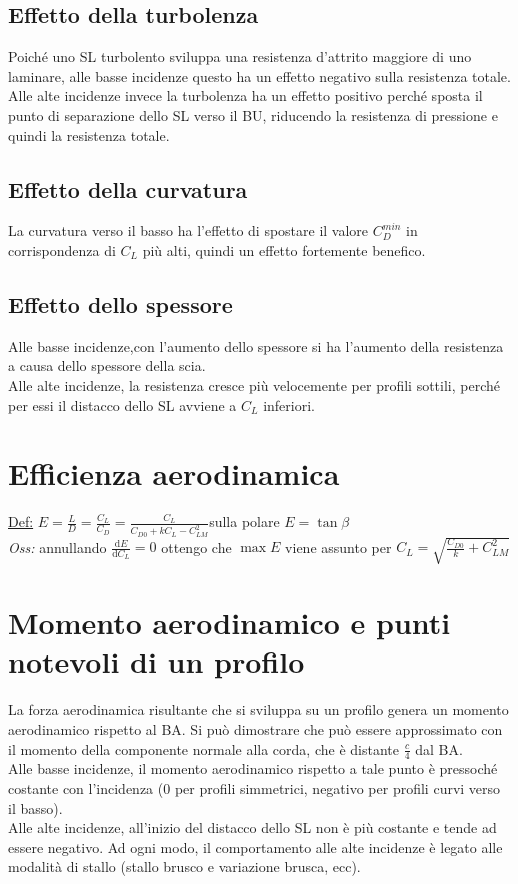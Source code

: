 \documentclass[11pt,a4paper]{report}
\newcommand{\de}{\mathrm d}
\begin{document}
		\subsection{Effetto della turbolenza}
		Poiché uno SL turbolento sviluppa una resistenza d'attrito maggiore di uno laminare, alle basse incidenze questo ha un effetto negativo sulla resistenza totale. Alle alte incidenze invece la turbolenza ha un effetto positivo perché sposta il punto di separazione dello SL verso il BU, riducendo la resistenza di pressione e quindi la resistenza totale.
		\subsection{Effetto della curvatura}
		La curvatura verso il basso ha l'effetto di spostare il valore $C_D^{min}$ in corrispondenza di $C_L$ più alti, quindi un effetto fortemente benefico.
		\subsection{Effetto dello spessore}
		Alle basse incidenze,con l'aumento dello spessore si ha l'aumento della resistenza a causa dello spessore della scia.\\
		Alle alte incidenze, la resistenza cresce più velocemente per profili sottili, perché per essi il distacco dello SL avviene a $C_L$ inferiori.

	\section{Efficienza aerodinamica}
	\underline{Def:} $E=\frac LD=\frac{C_L}{C_D}=\frac{C_L}{C_{D0}+kC_L-C_{LM}^2}$\qquad sulla polare $E=\tan\beta$\\
	\textit{Oss:} annullando $\frac{\de E}{\de C_L}=0$ ottengo che $\max E$ viene assunto per $C_L=\sqrt{\frac{C_{D0}}{k}+C_{LM}^2}$

	\section{Momento aerodinamico e punti notevoli di un profilo}
	La forza aerodinamica risultante che si sviluppa su un profilo genera un momento aerodinamico rispetto al BA. Si può dimostrare che può essere approssimato con il momento della componente normale alla corda, che è distante $\frac c4$ dal BA.\\
	Alle basse incidenze, il momento aerodinamico rispetto a tale punto è pressoché costante con l'incidenza (0 per profili simmetrici, negativo per profili curvi verso il basso).\\
	Alle alte incidenze, all'inizio del distacco dello SL non è più costante e tende ad essere negativo. Ad ogni modo, il comportamento alle alte incidenze è legato alle modalità di stallo (stallo brusco e variazione brusca, ecc).
\end{document}
